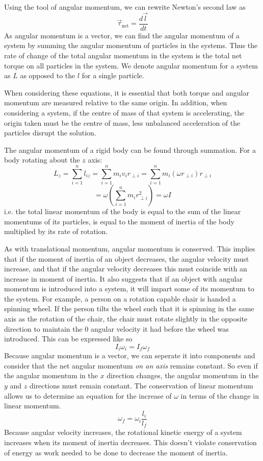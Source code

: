 \documentclass[12pt]{report}
\begin{document}
\begin{flushleft}
\bigskip
Using the tool of angular momentum, we can rewrite Newton's second law as
\[\vec{\tau}_\mathrm{net} = \frac{d\vec{l}}{dt}\]
As angular momentum is a vector, we can find the angular momentum of a system
by summing the angular momentum of particles in the systems. Thus the rate of
change of the total angular momentum in the system is the total net torque on 
all particles in the system. We denote angular momentum for a system as \(L\)
as opposed to the \(l\) for a single particle.

\bigskip
When considering these equations, it is essential that both torque and angular
momentum are measured relative to the same origin. In addition, when 
considering a system, if the centre of mass of that system is accelerating, the
origin taken must be the centre of mass, less unbalanced acceleration of the 
particles disrupt the solution.

\bigskip
The angular momentum of a rigid body can be found through summation. For a body
rotating about the \(z\) axis:
\[L_z = \sum^n_{i = 1}l_{iz} = \sum^n_{i = 1} m_iv_ir_{\perp i} =
\sum^n_{i = 1} m_i(\omega r_{\perp i})r_{\perp i}\]
\[= \omega\left(\sum^n_{i = 1}m_ir^2_{\perp i}\right) = \omega I\]
i.e. the total linear momentum of the body is equal to the sum of the linear 
momentums of its particles, is equal to the moment of inertia of the body
multiplied by its rate of rotation.

\bigskip
As with translational momentum, angular momentum is conserved. This implies 
that if the moment of inertia of an object decreases, the angular velocity
must increase, and that if the angular velocity decreases this must coincide
with an increase in moment of inertia. It also suggests that if an object 
with angular momentum is introduced into a system, it will impart some of
its momentum to the system. For example, a person on a rotation capable chair
is handed a spinning wheel. If the person tilts the wheel such that it is 
spinning in the same axis as the rotation of the chair, the chair must rotate
slightly in the opposite direction to maintain the \(0\) angular velocity
it had before the wheel was introduced. This can be expressed like so
\[I_i\omega_i = I_f\omega_f\]
Because angular momentum is a vector, we can seperate it into components and
consider that the net angular momentum \textit{on an axis} remains constant.
So even if the angular momentum in the \(x\) direction changes, the angular
momentum in the \(y\) and \(z\) directions must remain constant. The 
conservation of linear momentum allows us to determine an equation for the
increase of \(\omega\) in terms of the change in linear momentum.
\[\omega_f = \omega_i\frac{l_i}{l_f}\]
Because angular velocity increases, the rotational kinetic energy of a system
increases when its moment of inertia decreases. This doesn't violate 
conservation of energy as work needed to be done to decrease the moment of 
inertia.


\end{flushleft}
\end{document}
